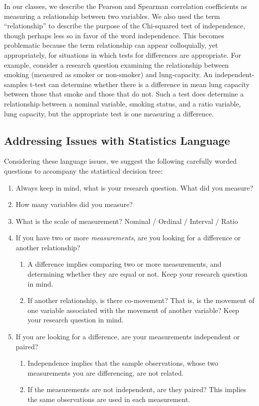 \documentclass[12pt]{article}
\newcommand{\be}{\begin{enumerate}}
\newcommand{\ee}{\end{enumerate}}
\begin{document}
In our classes, we describe the Pearson and Spearman correlation coefficients as measuring a relationship between two variables.  We also used the term ``relationship'' to describe the purpose of the Chi-squared test of independence, though perhaps less so in favor of the word independence.  This becomes problematic because the term relationship can appear colloquially, yet appropriately, for situations in which tests for differences are appropriate.  For example, consider a research question examining the relationship between smoking (measured as smoker or non-smoker) and lung-capacity.  An independent-samples t-test can determine whether there is a difference in mean lung capacity between those that smoke and those that do not.  Such a test does determine a relationship between a nominal variable, smoking status, and a ratio variable, lung capacity, but the appropriate test is one measuring a difference. 

\subsection{Addressing Issues with Statistics Language}
Considering these language issues, we suggest the following carefully worded questions to accompany the statistical decision tree:

\be
\item Always keep in mind, what is your research question.  What did you measure?
\item How many variables did you measure?
\item What is the scale of measurement?  Nominal / Ordinal / Interval / Ratio
\item If you have two or more \textit{measurements}, are you looking for a difference or another relationship?  
  \be
  \item A difference implies comparing two or more measurements, and determining whether they are equal or not.  Keep your research question in mind.
  \item If another relationship, is there co-movement?  That is, is the movement of one variable associated with the movement of another variable?  Keep your research question in mind.
  \ee
\item If you are looking for a difference, are your measurements independent or paired?
  \be
  \item Independence implies that the sample observations, whose two measurements you are differencing, are not related.
  \item If the measurements are not independent, are they paired?  This implies the same observations are used in each measurement.
  \ee
\ee
\end{document}
